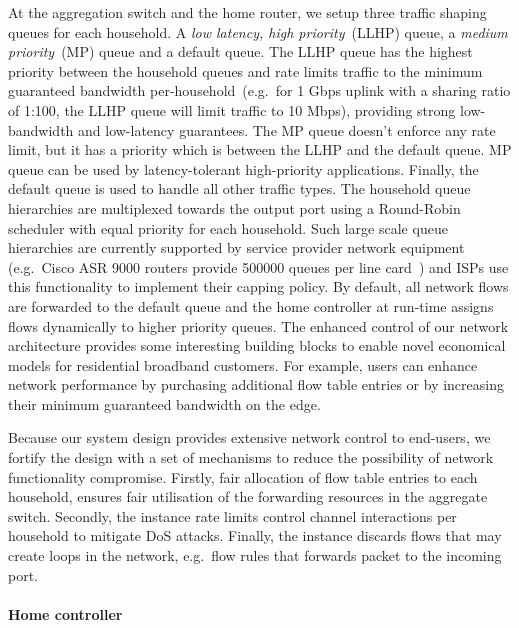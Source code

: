 At the aggregation switch and the home router, we setup three traffic shaping
queues for each household. A \textit{low latency, high priority}~(LLHP) queue, a
\textit{medium priority}~(MP) queue and a default queue.  The LLHP queue has the
highest priority between the household queues and rate limits traffic to the
minimum guaranteed bandwidth per-household~(e.g.~for 1 Gbps uplink with a sharing
ratio of 1:100, the LLHP queue will limit traffic to 10 Mbps), providing strong
low-bandwidth and low-latency guarantees. The MP queue doesn't enforce any rate
limit, but it has a priority which is between the LLHP and the default queue.
MP queue can be used by latency-tolerant high-priority applications.  Finally,
the default queue is used to handle all other traffic types.  The household
queue hierarchies are multiplexed towards the output port using a Round-Robin
scheduler with equal priority for each household. Such large scale queue
hierarchies are currently supported by service provider network equipment
(e.g.~Cisco ASR 9000 routers provide 500000 queues per line
card~) and ISPs use this functionality to implement their
capping policy. By default, all network flows are forwarded to the default queue
and the home \of controller at run-time assigns flows dynamically to higher
priority queues.  The enhanced control of our network architecture
provides some interesting building blocks to enable novel economical models for
residential broadband customers. For example, users can enhance network
performance by purchasing additional flow table entries or by increasing their
minimum guaranteed bandwidth on the edge.

Because our system design provides extensive network control to end-users, we
fortify the design with a set of mechanisms to reduce the possibility
of network functionality compromise.  Firstly, fair allocation of flow table
entries to each household, ensures fair utilisation of the forwarding resources
in the aggregate switch. Secondly, the \flv instance rate limits \of
control channel interactions per household to mitigate DoS attacks. Finally, the
\flv instance discards flows that may create loops in the network,
e.g.~flow rules that forwards packet to the incoming port. 

\paragraph*{Home \of controller}


